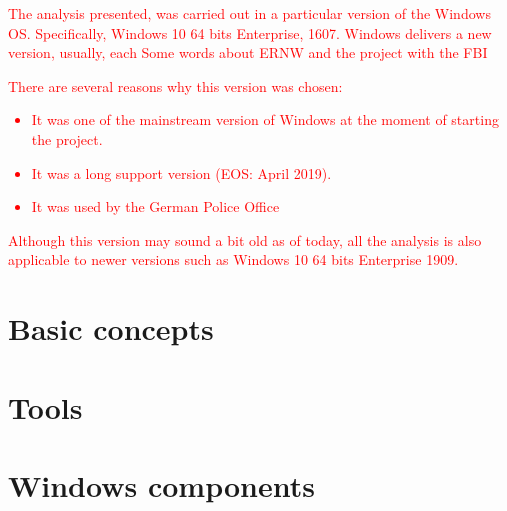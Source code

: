 
\textcolor{red}{The analysis presented, was carried out in a particular version of the Windows OS. Specifically, Windows 10 64 bits Enterprise, 1607. Windows delivers a new version, usually, each 
Some words about ERNW and the project with the FBI}

\textcolor{red}{There are several reasons why this version was chosen:
\begin{itemize}
    \item It was one of the mainstream version of Windows at the moment of starting the project.
    \item It was a long support version (EOS: April 2019).
    \item It was used by the German Police Office
\end{itemize}
Although this version may sound a bit old as of today, all the analysis is also applicable to newer versions such as Windows 10 64 bits Enterprise 1909. 
}

\section{Basic concepts}
    

\section{Tools}
    

\section{Windows components}
    

